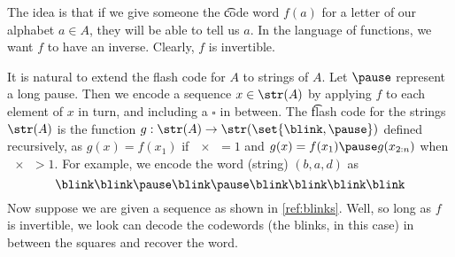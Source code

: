 The idea is that if we give someone the \t{code word} $f(a)$ for a letter of our alphabet $a \in A$, they will be able to tell us $a$.
In the language of functions, we want $f$ to have an inverse.
Clearly, $f$ is invertible.

It is natural to extend the flash code for $A$ to strings of $A$.
Let $\pause$ represent a long pause.
Then we encode a sequence $x \in \str(A)$ by applying $f$ to each element of $x$ in turn, and including a $\square$ in between.
The \t{flash code} for the strings $\str(A)$ is the function $g: \str(A) \to \str(\set{\blink, \pause})$ defined recursively, as $g(x) = f(x_1)$ if $\num{x} = 1$ and $g(x) = f(x_1)\pause g(x_{2:n})$ when $\num{x} > 1$.
For example, we encode the word (string) $(b,a,d)$ as
\begin{equation}
\label{ref:blinks}\blink
\blink
\pause
\blink
\pause
\blink
\blink
\blink
\blink\end{equation}
Now suppose we are given a sequence as shown in \eqref{ref:blinks}.
Well, so long as $f$ is invertible, we look can decode the codewords (the blinks, in this case) in between the squares and recover the word.
